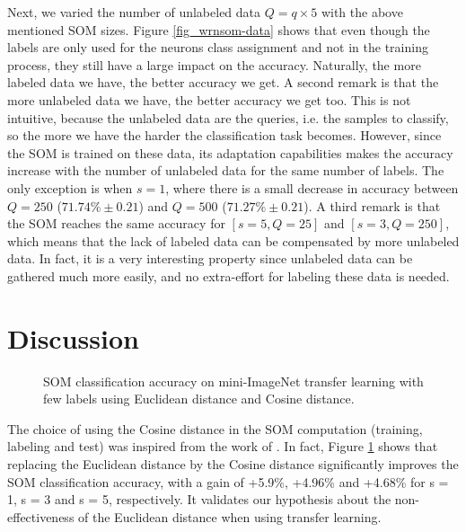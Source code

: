 \documentclass[runningheads]{llncs}
\begin{document}
Next, we varied the number of unlabeled data $Q = q\times5$ with the above mentioned SOM sizes. Figure \ref{fig_wrnsom-data} shows that even though the labels are only used for the neurons class assignment and not in the training process, they still have a large impact on the accuracy. Naturally, the more labeled data we have, the better accuracy we get. 
A second remark is that the more unlabeled data we have, the better accuracy we get too. This is not intuitive, because the unlabeled data are the queries, i.e. the samples to classify, so the more we have the harder the classification task becomes. However, since the SOM is trained on these data, its adaptation capabilities makes the accuracy increase with the number of unlabeled data for the same number of labels. The only exception is when $s = 1$, where there is a small decrease in accuracy between $Q = 250$ ($71.74\% \pm 0.21$) and $Q = 500$ ($71.27\% \pm 0.21$).
A third remark is that the SOM reaches the same accuracy for $[s = 5, Q = 25]$ and $[s = 3, Q = 250]$, which means that the lack of labeled data can be compensated by more unlabeled data. In fact, it is a very interesting property since unlabeled data can be gathered much more easily, and no extra-effort for labeling these data is needed.



\section{Discussion}
\label{sec_discussion}

\begin{figure}[h]
	\centerline{}
	\caption{SOM classification accuracy on mini-ImageNet transfer learning with few labels using Euclidean distance and Cosine distance.}
	\label{fig_cosine-distance}
\end{figure}

The choice of using the Cosine distance in the SOM computation (training, labeling and test) was inspired from the work of \cite{hu2020accurate_few_shot}. In fact, Figure \ref{fig_cosine-distance} shows that replacing the Euclidean distance by the Cosine distance significantly improves the SOM classification accuracy, with a gain of +5.9\%, +4.96\% and +4.68\% for s = 1, s = 3 and s = 5, respectively. It validates our hypothesis about the non-effectiveness of the Euclidean distance when using transfer learning.
\end{document}
